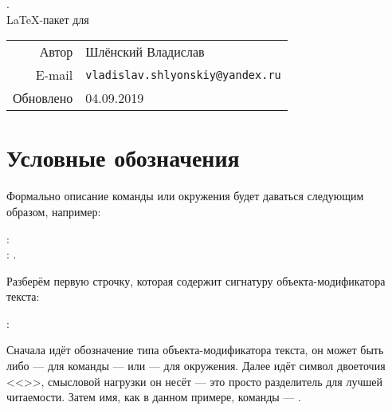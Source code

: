 \newpage 

\thispagestyle{empty}

\vspace*{7cm}
\begin{center}
    { \huge {}. } \\[1cm]
    { \Large \LaTeX-пакет для  }\\
\end{center}


\vspace*{7cm}
\begin{flushright}
    \begin{tabular}{@{}r@{\hskip .75cm}l@{}}
        Автор &  Шлёнский Владислав \\
        E-mail & \texttt{vladislav.shlyonskiy@yandex.ru} \\
        Обновлено & 04.09.2019
    \end{tabular}
\end{flushright}


\newpage

\tableofcontents

\newpage




\section{Условные обозначения}

Формально описание команды или окружения будет даваться следующим образом, например:
\begin{tcolorbox}
    \small \rsTypeAux: \\
    \hspace*{1cm} \rsOptionsAux: . 
\end{tcolorbox}

Разберём первую строчку, которая содержит сигнатуру объекта-модификатора текста:
\begin{center}
    \rsTypeAux:
\end{center}
Сначала идёт обозначение типа объекта-модификатора текста, он может быть либо \rsTypeAux\space --- для команды --- или \rsTypeAux[env] --- для окружения. Далее идёт символ двоеточия <<\rsCodeAux{:}>>, смысловой нагрузки он несёт --- это просто разделитель для лучшей читаемости. Затем имя, как в данном примере, команды --- . 

